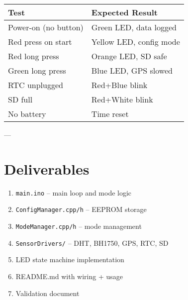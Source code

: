 \documentclass[a4paper,12pt]{article}
\begin{document}
\begin{longtable}{|l|l|}
\hline
\textbf{Test} & \textbf{Expected Result} \\ \hline
Power-on (no button) & Green LED, data logged \\ \hline
Red press on start & Yellow LED, config mode \\ \hline
Red long press & Orange LED, SD safe \\ \hline
Green long press & Blue LED, GPS slowed \\ \hline
RTC unplugged & Red+Blue blink \\ \hline
SD full & Red+White blink \\ \hline
No battery & Time reset \\ \hline
\end{longtable}

---

\section{Deliverables}
\begin{enumerate}
  \item \texttt{main.ino} – main loop and mode logic
  \item \texttt{ConfigManager.cpp/h} – EEPROM storage
  \item \texttt{ModeManager.cpp/h} – mode management
  \item \texttt{SensorDrivers/} – DHT, BH1750, GPS, RTC, SD
  \item LED state machine implementation
  \item README.md with wiring + usage
  \item Validation document
\end{enumerate}
\end{document}
